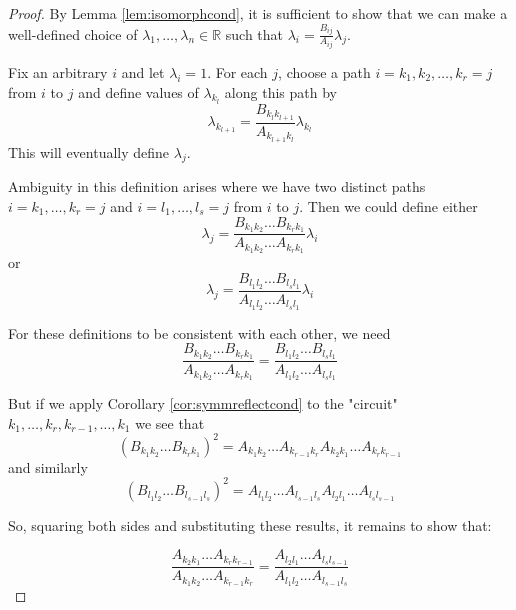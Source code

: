 \documentclass[11pt,a4paper]{report}
\theoremstyle{definition}
\begin{document}
\begin{proof} By Lemma \ref{lem:isomorphcond}, it is sufficient to show that we can make a well-defined choice of $\lambda_1, \ldots, \lambda_n \in \mathbb{R}$ such that $\lambda_i = \frac{B_{ij}}{A_{ij}} \lambda_j$. 

Fix an arbitrary $i$ and let $\lambda_i = 1$. For each $j$, choose a path $i = k_1, k_2, \ldots, k_r = j$  from $i$ to $j$ and define values of $\lambda_{k_l}$ along this path by \begin{equation*}\lambda_{k_{l+1}} = \dfrac{B_{k_l k_{l+1}}}{A_{k_{l+1} k_l}} \lambda_{k_l}\end{equation*} This will eventually define $\lambda_j$.

Ambiguity in this definition arises where we have two distinct paths $i = k_1, \ldots, k_r = j$ and $i = l_1, \ldots, l_s = j$ from $i$ to $j$. Then we could define either \begin{equation*} \lambda_j = \dfrac{ B_{k_1k_2} \ldots B_{k_r k_1}}{A_{k_1k_2} \ldots A_{k_r k_1}} \lambda_i\end{equation*} or \begin{equation*} \lambda_j = \dfrac{B_{l_1l_2} \ldots B_{l_s l_1}}{A_{l_1l_2} \ldots A_{l_s l_1}} \lambda_i\end{equation*}

For these definitions to be consistent with each other, we need  \begin{equation*}\dfrac{B_{k_1k_2} \ldots B_{k_r k_1}}{A_{k_1k_2} \ldots A_{k_r k_1}}= \frac{B_{l_1l_2} \ldots B_{l_s l_1}}{A_{l_1l_2} \ldots A_{l_s l_1}}\end{equation*}

But if we apply Corollary \ref{cor:symmreflectcond} to the "circuit" $k_1, \ldots, k_r, k_{r-1}, \ldots, k_1$ we see that \begin{equation*}(B_{k_1k_2} \ldots B_{k_r k_1})^2 = A_{k_1k_2} \ldots A_{k_{r-1} k_r} A_{k_2k_1} \ldots A_{k_r k_{r-1}}\end{equation*} and similarly \begin{equation*}(B_{l_1l_2} \ldots B_{l_{s-1} l_s})^2 = A_{l_1l_2} \ldots A_{l_{s-1} l_s} A_{l_2l_1} \ldots A_{l_s l_{s-1}}\end{equation*}

So, squaring both sides and substituting these results, it remains to show that:

\begin{equation*} \dfrac{A_{k_2k_1}\ldots A_{k_rk_{r-1}}}{A_{k_1 k_2} \ldots A_{k_{r-1} k_r}}= \dfrac{A_{l_2l_1} \ldots A_{l_s l_{s-1}}}{A_{l_1 l_2} \ldots A_{l_{s-1} l_s}}\end{equation*}


\end{proof}
\end{document}
